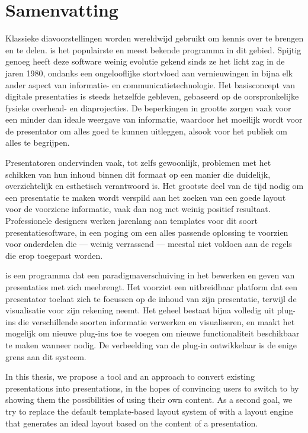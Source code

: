 
 \chapter*{Samenvatting}

  Klassieke diavoorstellingen worden wereldwijd gebruikt om kennis over te
  brengen en te delen. \ppt* is het populairste en meest bekende programma in
  dit gebied. Spijtig genoeg heeft deze software weinig evolutie gekend sinds
  ze het licht zag in de jaren 1980, ondanks een ongelooflijke stortvloed aan
  vernieuwingen in bijna elk ander aspect van informatie- en
  communicatietechnologie. Het basisconcept van digitale presentaties is steeds
  hetzelfde gebleven, gebaseerd op de oorspronkelijke fysieke overhead- en
  diaprojecties. De beperkingen in grootte zorgen vaak voor een minder dan
  ideale weergave van informatie, waardoor het moeilijk wordt voor de
  presentator om alles goed te kunnen uitleggen, alsook voor het publiek om
  alles te begrijpen.

  Presentatoren ondervinden vaak, tot zelfs gewoonlijk, problemen met het
  schikken van hun inhoud binnen dit formaat op een manier die duidelijk,
  overzichtelijk en esthetisch verantwoord is. Het grootste deel van de tijd
  nodig om een presentatie te maken wordt verspild aan het zoeken van een goede
  layout voor de voorziene informatie, vaak dan nog met weinig positief
  resultaat. Professionele designers werken jarenlang aan templates voor dit
  soort presentatiesoftware, in een poging om een alles passende oplossing te
  voorzien voor onderdelen die --- weinig verrassend --- meestal niet voldoen
  aan de regels die erop toegepast worden.

  \mxp is een programma dat een paradigmaverschuiving in het bewerken en geven
  van presentaties met zich meebrengt. Het voorziet een uitbreidbaar platform
  dat een presentator toelaat zich te focussen op de inhoud van zijn
  presentatie, terwijl \mxp de visualisatie voor zijn rekening neemt. Het
  geheel bestaat bijna volledig uit plug-ins die verschillende soorten
  informatie verwerken en visualiseren, en maakt het mogelijk om nieuwe
  plug-ins toe te voegen om nieuwe functionaliteit beschikbaar te maken wanneer
  nodig. De verbeelding van de plug-in ontwikkelaar is de enige grens aan dit
  systeem.

  In this thesis, we propose a tool and an approach to convert existing \ppt
  presentations into \mxp presentations, in the hopes of convincing \ppt users
  to switch to \mxp by showing them the possibilities of \mxp using their own
  content. As a second goal, we try to replace the default template-based
  layout system of \mxp with a layout engine that generates an ideal layout
  based on the content of a presentation.


